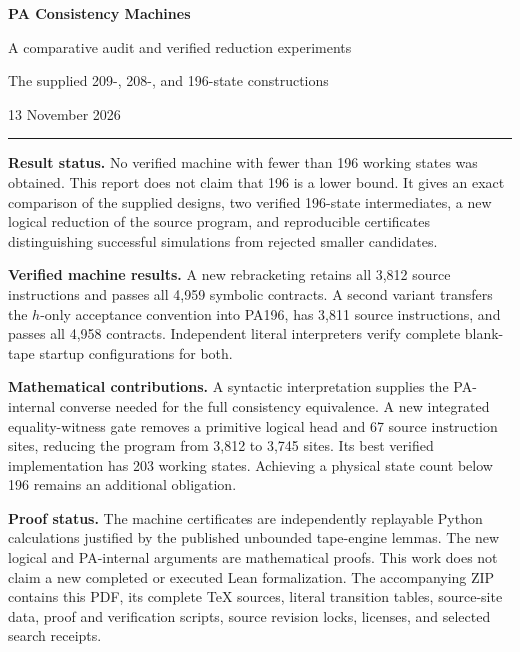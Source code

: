 \documentclass[11pt,letterpaper]{article}
\begin{document}
\begin{titlepage}
\vspace*{0.5in}
{\color{ink}\Huge\bfseries PA Consistency Machines\par}
\vspace{0.25in}
{\Large A comparative audit and verified reduction experiments\par}
\vspace{0.2in}
{\large The supplied 209-, 208-, and 196-state constructions\par}
\vspace{0.3in}
{\large 13 November 2026\par}
\vspace{0.4in}
\hrule\vspace{0.2in}
\textbf{Result status.} No verified machine with fewer than 196 working states
was obtained. This report does not claim that 196 is a lower bound. It gives
an exact comparison of the supplied designs, two verified 196-state
intermediates, a new logical reduction of the source program, and reproducible
certificates distinguishing successful simulations from rejected smaller
candidates.

\textbf{Verified machine results.} A new rebracketing retains all 3,812 source
instructions and passes all 4,959 symbolic contracts. A second variant
transfers the $h$-only acceptance convention into PA196, has 3,811 source
instructions, and passes all 4,958 contracts. Independent literal interpreters
verify complete blank-tape startup configurations for both.

\textbf{Mathematical contributions.} A syntactic interpretation supplies the
PA-internal converse needed for the full consistency equivalence. A new
integrated equality-witness gate removes a primitive logical head and 67
source instruction sites, reducing the program from 3,812 to 3,745 sites.
Its best verified implementation has 203 working states. Achieving a physical
state count below 196 remains an additional obligation.

\textbf{Proof status.} The machine certificates are independently replayable
Python calculations justified by the published unbounded tape-engine lemmas.
The new logical and PA-internal arguments are mathematical proofs. This work
does not claim a new completed or executed Lean formalization.
\vfill
\small The accompanying ZIP contains this PDF, its complete TeX sources, literal
transition tables, source-site data, proof and verification scripts, source
revision locks, licenses, and selected search receipts.\par
\end{titlepage}
\tableofcontents
\newpage
\end{document}
